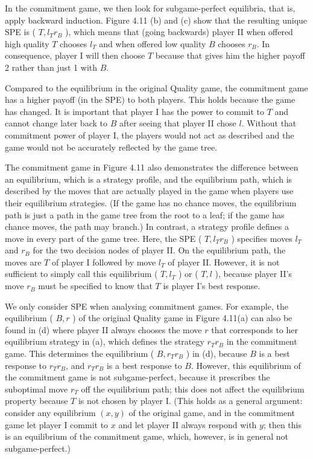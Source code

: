 \documentclass[12pt]{article}
\begin{document}
In the commitment game, we then look for subgame-perfect equilibria, that is, apply backward induction. Figure 4.11 (b) and (c) show that the resulting unique SPE is ( $T, l_{T} r_{B}$ ), which means that (going backwards) player II when offered high quality $T$ chooses $l_{T}$ and when offered low quality $B$ chooses $r_{B}$. In consequence, player I will then choose $T$ because that gives him the higher payoff 2 rather than just 1 with $B$.

Compared to the equilibrium in the original Quality game, the commitment game has a higher payoff (in the SPE) to both players. This holds because the game has changed. It is important that player I has the power to commit to $T$ and cannot change later back to $B$ after seeing that player II chose $l$. Without that commitment power of player I, the players would not act as described and the game would not be accurately reflected by the game tree.

The commitment game in Figure 4.11 also demonstrates the difference between an equilibrium, which is a strategy profile, and the equilibrium path, which is described by the moves that are actually played in the game when players use their equilibrium strategies. (If the game has no chance moves, the equilibrium path is just a path in the game tree from the root to a leaf; if the game has chance moves, the path may branch.) In contrast, a strategy profile defines a move in every part of the game tree. Here, the SPE ( $T, l_{T} r_{B}$ ) specifies moves $l_{T}$ and $r_{B}$ for the two decision nodes of player II. On the equilibrium path, the moves are $T$ of player I followed by move $l_{T}$ of player II. However, it is not sufficient to simply call this equilibrium ( $T, l_{T}$ ) or ( $T, l$ ), because player II's move $r_{B}$ must be specified to know that $T$ is player I's best response.

We only consider SPE when analysing commitment games. For example, the equilibrium ( $B, r$ ) of the original Quality game in Figure 4.11(a) can also be found in (d) where player II always chooses the move $r$ that corresponds to her equilibrium strategy in (a), which defines the strategy $r_{T} r_{B}$ in the commitment game. This determines the equilibrium ( $B, r_{T} r_{B}$ ) in (d), because $B$ is a best response to $r_{T} r_{B}$, and $r_{T} r_{B}$ is a best response to $B$. However, this equilibrium of the commitment game is not subgame-perfect, because it prescribes the suboptimal move $r_{T}$ off the equilibrium path; this does not affect the equilibrium property because $T$ is not chosen by player I. (This holds as a general argument: consider any equilibrium $(x, y)$ of the original game, and in the commitment game let player I commit to $x$ and let player II always respond with $y$; then this is an equilibrium of the commitment game, which, however, is in general not subgame-perfect.)
\end{document}

